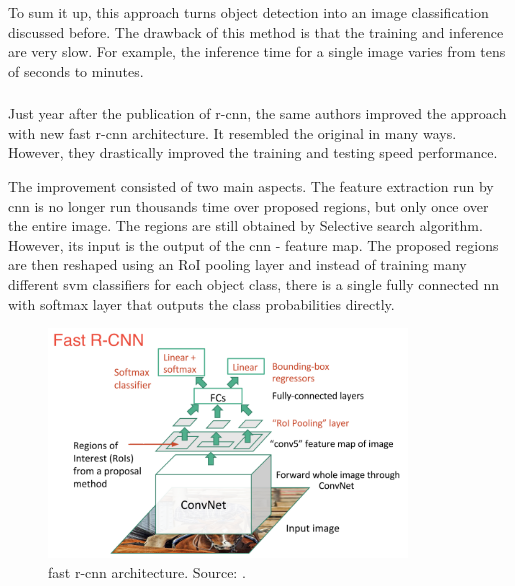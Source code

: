             To sum it up, this approach turns object detection into an image classification discussed before. The drawback of this method is that the training and inference are very slow. For example, the inference time for a single image varies from tens of seconds to minutes.

        \subsubsection{}
            Just year after the publication of \gls{r-cnn}, the same authors improved the approach with new \gls{fast r-cnn} \cite{girshick2015fast} architecture. It resembled the original in many ways. However, they drastically improved the training and testing speed performance.
            
            The improvement consisted of two main aspects. The feature extraction run by \gls{cnn} is no longer run thousands time over proposed regions, but only once over the entire image. The regions are still obtained by Selective search algorithm. However, its input is the output of the \gls{cnn} - feature map. The proposed regions are then reshaped using an RoI pooling layer and instead of training many different \gls{svm} classifiers for each object class, there is a single fully connected \gls{nn} with softmax layer that outputs the class probabilities directly.
            
            \begin{figure}[ht]
                \centering
                \includegraphics[width=0.85\textwidth]{resources/fast_r_cnn_architecture.png}
                \caption{\Gls{fast r-cnn} architecture. Source: \cite{xuobjectdetection}.}
                \label{fig:fast r-cnn architecture}
            \end{figure}
    

